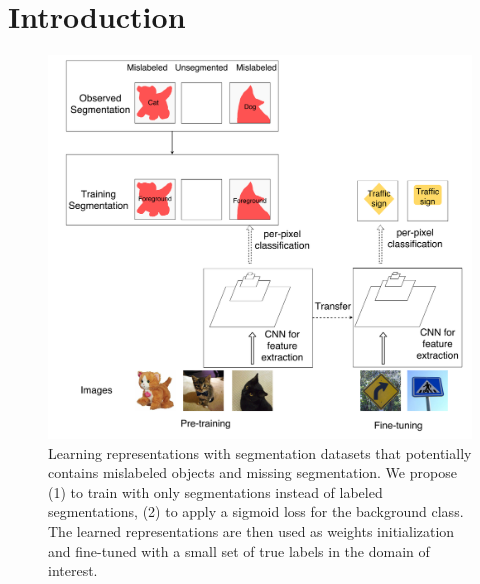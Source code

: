\section{Introduction}
\label{introduction}




\begin{figure}[t]
\begin{center}
   \includegraphics[width=1.0\linewidth]{img/figure1}
\end{center}
   \caption{
   Learning representations with segmentation datasets that potentially contains mislabeled objects and missing segmentation.
   We propose (1) to train with only segmentations instead of labeled segmentations, (2) to apply a sigmoid loss for the background class.
   The learned representations are then used as weights initialization and fine-tuned with a small set of true labels in the domain of interest.
   }
\label{fig:figure1}
\end{figure}



